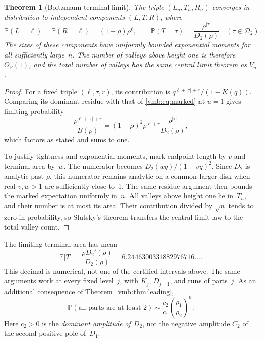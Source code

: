 \documentclass[11pt,a4paper]{article}
\numberwithin{equation}{section}
\newtheorem{theorem}{Theorem}[section]
\theoremstyle{definition}\newtheorem{definition}[theorem]{Definition}
\theoremstyle{remark}\newtheorem{remark}[theorem]{Remark}
\newcommand{\E}{\mathbb E}
\newcommand{\Prob}{\mathbb P}
\newcommand{\calD}{\mathcal D}
\begin{document}
\begin{theorem}[Boltzmann terminal limit]\label{vmb:thm:terminal}
The triple \((L_n,T_n,R_n)\) converges in distribution to independent
components \((L,T,R)\), where
\begin{equation}\label{vmb:eq:terminal}
\Prob(L=\ell)=\Prob(R=\ell)=(1-\rho)\rho^\ell,
\qquad
\Prob(T=\tau)=\frac{\rho^{|\tau|}}{D_2(\rho)}
\quad(\tau\in\calD_2).
\end{equation}
The sizes of these components have uniformly bounded exponential moments
for all sufficiently large~\(n\). The number of valleys above height
one is therefore \(O_{\Prob}(1)\), and the total number of valleys has
the same central limit theorem as \(V_n\).
\end{theorem}
\begin{proof}
For a fixed triple \((\ell,\tau,r)\), its contribution is
\(q^{\ell+|\tau|+r}/(1-K(q))\). Comparing its dominant residue with
that of \eqref{vmb:eq:marked} at \(u=1\) gives limiting probability
\[
\frac{\rho^{\ell+|\tau|+r}}{B(\rho)}
=(1-\rho)^2\rho^{\ell+r}
 \frac{\rho^{|\tau|}}{D_2(\rho)},
\]
which factors as stated and sums to one.

To justify tightness and exponential moments, mark endpoint length by
\(v\) and terminal area by~\(w\). The numerator becomes
\(D_2(wq)/(1-vq)^2\). Since \(D_2\) is analytic past \(\rho\),
this numerator remains analytic on a common larger disk when real
\(v,w>1\) are sufficiently close to~1. The same residue argument
then bounds the marked expectation uniformly in~\(n\).
All valleys above height one lie in~\(T_n\), and their number is at
most its area. Their contribution divided by \(\sqrt n\) tends to
zero in probability, so Slutsky's theorem transfers the central limit
law to the total valley count.
\end{proof}

The limiting terminal area has mean
\[
\E|T|=\frac{\rho D_2'(\rho)}{D_2(\rho)}
=6.2446300331882976716\ldots.
\]
This decimal is numerical, not one of the certified intervals above.
The same arguments work at every fixed level~\(j\), with \(K_j\),
\(D_{j+1}\), and runs of parts~\(j\). As an additional consequence of
Theorem~\ref{vmb:thm:leading},
\begin{equation}
\Prob(\text{all parts are at least }2)
\sim\frac{c_2}{c_1}\left(\frac{\rho_1}{\rho_2}\right)^n.
\end{equation}
Here \(c_2>0\) is the \emph{dominant amplitude of \(D_2\)}, not the
negative amplitude \(C_2\) of the second positive pole of~\(D_1\).
\end{document}
